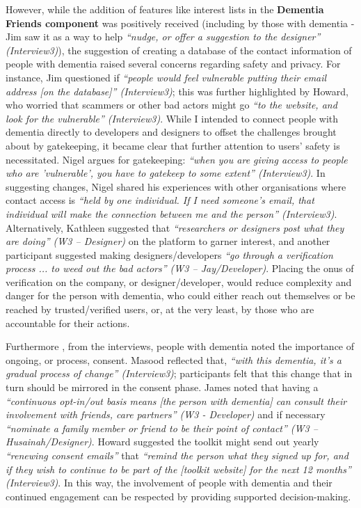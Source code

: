 However, while the addition of features like interest lists in the \textbf{Dementia Friends component} was positively received (including by those with dementia - Jim saw it as a way to help \textit{``nudge, or offer a suggestion to the designer'' (Interview3)}), the suggestion of creating a database of the contact information of people with dementia raised several concerns regarding safety and privacy. For instance, Jim questioned if \textit{``people would feel vulnerable putting their email address [on the database]'' (Interview3)}; this was further highlighted by Howard, who worried that scammers or other bad actors might go \textit{``to the website, and look for the vulnerable'' (Interview3)}. While I intended to connect people with dementia directly to developers and designers to offset the challenges brought about by gatekeeping, it became clear that further attention to users’ safety is necessitated. Nigel argues for gatekeeping: \textit{``when you are giving access to people who are 'vulnerable', you have to gatekeep to some extent'' (Interview3)}. In suggesting changes, Nigel shared his experiences with other organisations where contact access is \textit{``held by one individual. If I need someone's email, that individual will make the connection between me and the person'' (Interview3)}. Alternatively, Kathleen suggested that \textit{``researchers or designers post what they are doing'' (W3 – Designer)} on the platform to garner interest, and another participant suggested making designers/developers \textit{``go through a verification process ... to weed out the bad actors'' (W3 – Jay/Developer)}. Placing the onus of verification on the company, or designer/developer, would reduce complexity and danger for the person with dementia, who could either reach out themselves or be reached by trusted/verified users, or, at the very least, by those who are accountable for their actions.  

Furthermore , from the interviews, people with dementia noted the importance of ongoing, or process, consent. Masood reflected that, \textit{``with this dementia, it's a gradual process of change'' (Interview3)}; participants felt that this change that in turn should be mirrored in the consent phase. James noted that having a \textit{``continuous opt-in/out basis means [the person with dementia] can consult their involvement with friends, care partners'' (W3 - Developer)} and if necessary \textit{``nominate a family member or friend to be their point of contact'' (W3 – Husainah/Designer)}. Howard suggested the toolkit might send out yearly \textit{``renewing consent emails''} that \textit{``remind the person what they signed up for, and if they wish to continue to be part of the [toolkit website] for the next 12 months'' (Interview3)}. In this way, the involvement of people with dementia and their continued engagement can be respected by providing supported decision-making. 

